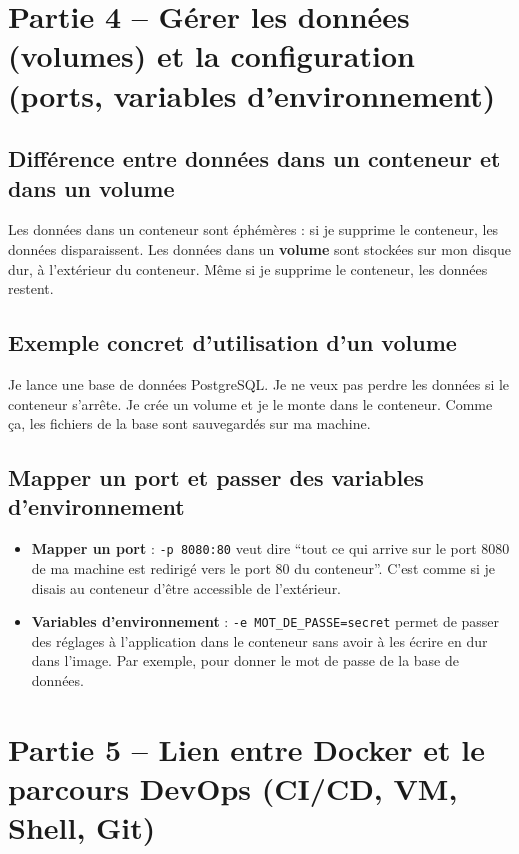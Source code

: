 \documentclass[12pt,a4paper]{article}
\begin{document}
\section{Partie 4 – Gérer les données (volumes) et la configuration (ports, variables d’environnement)}

\subsection{Différence entre données dans un conteneur et dans un volume}

Les données dans un conteneur sont éphémères : si je supprime le conteneur, les données disparaissent. Les données dans un \textbf{volume} sont stockées sur mon disque dur, à l’extérieur du conteneur. Même si je supprime le conteneur, les données restent.

\subsection{Exemple concret d'utilisation d'un volume}

Je lance une base de données PostgreSQL. Je ne veux pas perdre les données si le conteneur s’arrête. Je crée un volume et je le monte dans le conteneur. Comme ça, les fichiers de la base sont sauvegardés sur ma machine.

\subsection{Mapper un port et passer des variables d’environnement}

\begin{itemize}
    \item \textbf{Mapper un port} : \texttt{-p 8080:80} veut dire “tout ce qui arrive sur le port 8080 de ma machine est redirigé vers le port 80 du conteneur”. C’est comme si je disais au conteneur d’être accessible de l’extérieur.
    \item \textbf{Variables d’environnement} : \texttt{-e MOT\_DE\_PASSE=secret} permet de passer des réglages à l’application dans le conteneur sans avoir à les écrire en dur dans l’image. Par exemple, pour donner le mot de passe de la base de données.
\end{itemize}

\section{Partie 5 – Lien entre Docker et le parcours DevOps (CI/CD, VM, Shell, Git)}
\end{document}
